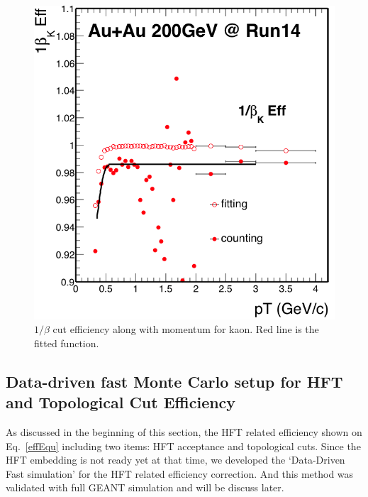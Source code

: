 \begin{figure}[htbp]
\begin{minipage}[htbp]{0.5\linewidth}
\includegraphics[width=1.0\textwidth]{figure/Run14_D0HFT/nSigKaonTof_eff.png}
\caption{$1/\beta$ cut efficiency along with momentum for kaon. Red line is the fitted function. \label{fig:kaontofeff}}
\end{minipage}
\end{figure}


\subsection{Data-driven fast Monte Carlo setup for HFT and Topological Cut Efficiency}

As discussed in the beginning of this section, the HFT related efficiency shown on Eq.~\ref{effEqu} including two items: HFT acceptance and topological cuts. Since the HFT embedding is not ready yet at that time, we developed the `Data-Driven Fast simulation' for the HFT related efficiency correction. And this method was validated with full GEANT simulation and will be discuss later.

